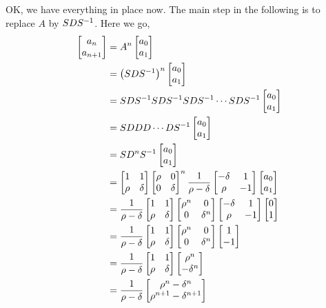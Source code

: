\documentclass{ximera}
\begin{document}
\begin{example}
OK, we have everything in place now.  The main step in the following
is to replace $A$ by $SDS^{-1}$. Here we go,
\begin{align*}
\begin{bmatrix}a_n\\a_{n+1}\end{bmatrix}
&=A^n\begin{bmatrix}a_{0}\\a_{1}\end{bmatrix}\\
&=\left(SDS^{-1}\right)^n\begin{bmatrix}a_{0}\\a_{1}\end{bmatrix}\\
&=SDS^{-1}SDS^{-1}SDS^{-1}\cdots SDS^{-1}\begin{bmatrix}a_{0}\\a_{1}\end{bmatrix}\\
&=SDDD\cdots DS^{-1}\begin{bmatrix}a_{0}\\a_{1}\end{bmatrix}\\
&=SD^nS^{-1}\begin{bmatrix}a_{0}\\a_{1}\end{bmatrix}\\
&=
\begin{bmatrix}1&1\\\rho&\delta\end{bmatrix}
\begin{bmatrix}\rho&0\\0&\delta\end{bmatrix}^n
\frac{1}{\rho-\delta}\begin{bmatrix}-\delta&1\\\rho&-1\end{bmatrix}
\begin{bmatrix}a_{0}\\a_{1}\end{bmatrix}\\
&=
\frac{1}{\rho-\delta}
\begin{bmatrix}1&1\\\rho&\delta\end{bmatrix}
\begin{bmatrix}\rho^n&0\\0&\delta^n\end{bmatrix}
\begin{bmatrix}-\delta&1\\\rho&-1\end{bmatrix}
\begin{bmatrix}0\\1\end{bmatrix}\\
&=
\frac{1}{\rho-\delta}
\begin{bmatrix}1&1\\\rho&\delta\end{bmatrix}
\begin{bmatrix}\rho^n&0\\0&\delta^n\end{bmatrix}
\begin{bmatrix}1\\-1\end{bmatrix}\\
&=
\frac{1}{\rho-\delta}
\begin{bmatrix}1&1\\\rho&\delta\end{bmatrix}
\begin{bmatrix}\rho^n\\-\delta^n\end{bmatrix}\\
&=
\frac{1}{\rho-\delta}
\begin{bmatrix}\rho^n-\delta^n\\\rho^{n+1}-\delta^{n+1}\end{bmatrix}
\end{align*}


\end{example}
\end{document}
